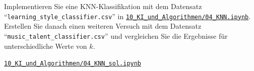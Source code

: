 \begin{myexercise}
    Implementieren Sie eine KNN-Klassifikation mit dem Datensatz \enquote{\texttt{learning\_style\_classifier.csv}} in \href{\notebookurl}{\texttt{10\_KI\_und\_Algorithmen/04\_KNN.ipynb}}. Erstellen Sie danach einen weiteren Versuch mit dem Datensatz \enquote{\texttt{music\_talent\_classifier.csv}} und vergleichen Sie die Ergebnisse für unterschiedliche Werte von $k$.

    \begin{myanswer}
        \href{\notebookurl}{\texttt{10\_KI\_und\_Algorithmen/04\_KNN\_sol.ipynb}}
    \end{myanswer}
\end{myexercise}

